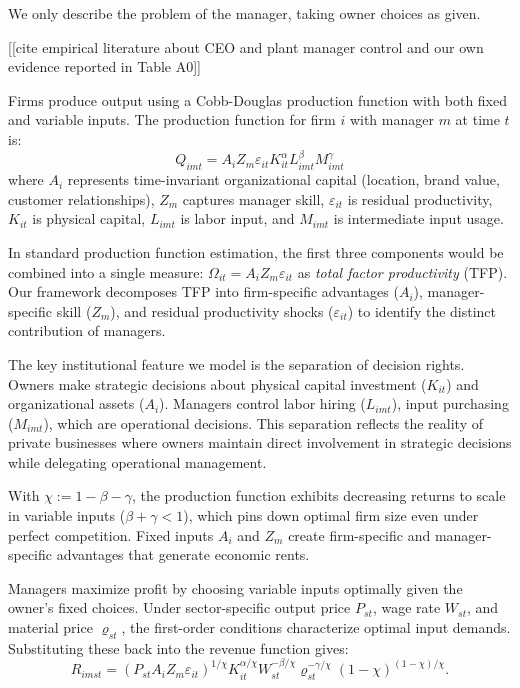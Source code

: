 \documentclass[11pt,a4paper]{article}
\begin{document}
We only describe the problem of the manager, taking owner choices as given. 

[[cite empirical literature about CEO and plant manager control and our own evidence reported in Table A0]]

Firms produce output using a Cobb-Douglas production function with both fixed and variable inputs. The production function for firm $i$ with manager $m$ at time $t$ is:
\begin{equation}\label{eq:production}
Q_{imt} = A_i Z_{m} \varepsilon_{it} K_{it}^\alpha L_{imt}^{\beta} M_{imt}^{\gamma}
\end{equation}
where $A_i$ represents time-invariant organizational capital (location, brand value, customer relationships), $Z_m$ captures manager skill, $\varepsilon_{it}$ is residual productivity, $K_{it}$ is physical capital, $L_{imt}$ is labor input, and $M_{imt}$ is intermediate input usage. 

In standard production function estimation, the first three components would be combined into a single measure: $\Omega_{it} = A_i Z_m \varepsilon_{it}$ as \emph{total factor productivity} (TFP). Our framework decomposes TFP into firm-specific advantages ($A_i$), manager-specific skill ($Z_m$), and residual productivity shocks ($\varepsilon_{it}$) to identify the distinct contribution of managers. 

The key institutional feature we model is the separation of decision rights. Owners make strategic decisions about physical capital investment ($K_{it}$) and organizational assets ($A_i$). Managers control labor hiring ($L_{imt}$), input purchasing ($M_{imt}$), which are operational decisions. This separation reflects the reality of private businesses where owners maintain direct involvement in strategic decisions while delegating operational management.

With $\chi := 1 - \beta - \gamma$, the production function exhibits decreasing returns to scale in variable inputs ($\beta + \gamma < 1$), which pins down optimal firm size even under perfect competition. Fixed inputs $A_i$ and $Z_m$ create firm-specific and manager-specific advantages that generate economic rents.

Managers maximize profit by choosing variable inputs optimally given the owner's fixed choices. Under sector-specific output price $P_{st}$, wage rate $W_{st}$, and material price $\varrho_{st}$, the first-order conditions characterize optimal input demands. Substituting these back into the revenue function gives:
\begin{equation}\label{eq:revenue}
R_{imst} = (P_{st}A_i Z_m \varepsilon_{it})^{1/\chi}
K_{it}^{\alpha/\chi}
W_{st}^{-\beta/\chi}
\varrho_{st}^{-\gamma/\chi}
(1-\chi)^{(1-\chi)/\chi}.
\end{equation}
\end{document}
